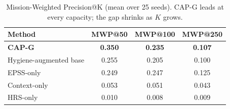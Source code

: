 \begin{table}[t]
\centering
\caption{Mission-Weighted Precision@K (mean over 25 seeds). CAP-G leads at every capacity; the gap shrinks as $K$ grows.}
\label{tab:mwp}
\footnotesize
\begin{tabular}{@{}lccc@{}}
\toprule
Method & MWP@50 & MWP@100 & MWP@250 \\
\midrule
\textbf{CAP-G} & \textbf{0.350} & \textbf{0.235} & \textbf{0.107} \\
Hygiene-augmented base & 0.255 & 0.205 & 0.100 \\
EPSS-only & 0.249 & 0.247 & 0.125 \\
Context-only & 0.053 & 0.051 & 0.043 \\
HRS-only & 0.010 & 0.008 & 0.009 \\
\bottomrule
\end{tabular}
\end{table}
